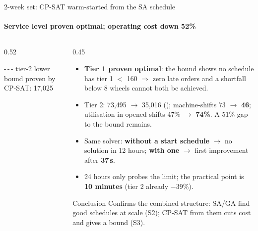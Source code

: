 \begin{frame}{2-week set: CP-SAT warm-started from the SA schedule}
\framesubtitle{Service level proven optimal; operating cost down 52\%}
\begin{columns}[T]
\begin{column}{0.52\textwidth}
\centering
{}\par
{\tiny\textcolor{bkorange}{-\,-\,-} tier-2 lower bound proven by CP-SAT: 17,025\par}
\end{column}
\begin{column}{0.45\textwidth}
\scriptsize
\begin{itemize}\setlength{\itemsep}{0.35em}
  \item \textbf{Tier 1 proven optimal}: the bound shows no schedule has tier 1 $<$ 160 $\Rightarrow$
        zero late orders and a shortfall below 8 wheels cannot both be achieved.
  \item Tier 2: 73,495 $\to$ 35,016 (); machine-shifts 73 $\to$ \textbf{46};
        utilisation in opened shifts 47\% $\to$ \textbf{74\%}. A 51\% gap to the bound remains.
  \item Same solver: \textbf{without a start schedule} $\to$ no solution in 12 hours;
        \textbf{with one} $\to$ first improvement after \textbf{37\,s}.
  \item 24 hours only probes the limit; the practical point is \textbf{10 minutes} (tier 2 already $-$39\%).
\end{itemize}
\vspace{0.2em}
\begin{exampleblock}{Conclusion}
\scriptsize Confirms the combined structure: SA/GA find good schedules at scale (S2); CP-SAT from them cuts cost and gives a bound (S3).
\end{exampleblock}
\end{column}
\end{columns}
\end{frame}

